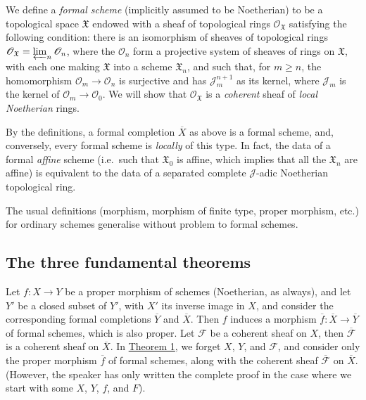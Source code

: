 \documentclass{article}
\newcommand{\oldpage}[1]{\marginpar{\footnotesize$\Big\vert$ \textit{p.~#1}}}
\theoremstyle{definition}
\theoremstyle{definition}
\theoremstyle{definition}
\theoremstyle{definition}
\theoremstyle{remark}
\begin{document}
We define a \emph{formal scheme} (implicitly assumed to be Noetherian) to be a topological space \({\mathfrak{X}}\) endowed with a sheaf of topological rings \({\mathscr{O}}_{{\mathfrak{X}}}\) satisfying the following condition:
there is an isomorphism of sheaves of topological rings \({\mathscr{O}}_{{\mathfrak{X}}}=\varprojlim_n{\mathscr{O}}_n\), where the \({\mathscr{O}}_n\) form a projective system of sheaves of rings on \({\mathfrak{X}}\), with each one making \({\mathfrak{X}}\) into a scheme \({\mathfrak{X}}_n\), and such that, for \(m\geqslant n\), the homomorphism \({\mathscr{O}}_m\to{\mathscr{O}}_n\) is surjective and has \({\mathscr{J}}_m^{n+1}\) as its kernel, where \({\mathscr{J}}_m\) is the kernel of \({\mathscr{O}}_m\to{\mathscr{O}}_0\).
We will show that \({\mathscr{O}}_{{\mathfrak{X}}}\) is a \emph{coherent} sheaf of \emph{local Noetherian} rings.

\oldpage{182-04}By the definitions, a formal completion \(\overline{X}\) as above is a formal scheme, and, conversely, every formal scheme is \emph{locally} of this type.
In fact, the data of a formal \emph{affine} scheme (i.e.~such that \({\mathfrak{X}}_0\) is affine, which implies that all the \({\mathfrak{X}}_n\) are affine) is equivalent to the data of a separated complete \({\mathscr{J}}\)-adic Noetherian topological ring.

The usual definitions (morphism, morphism of finite type, proper morphism, etc.) for ordinary schemes generalise without problem to formal schemes.

\hypertarget{fga-2-section-3}{%
\subsection{The three fundamental theorems}\label{fga-2-section-3}}

Let \(f\colon X\to Y\) be a proper morphism of schemes (Noetherian, as always), and let \(Y'\) be a closed subset of \(Y'\), with \(X'\) its inverse image in \(X\), and consider the corresponding formal completions \(\overline{Y}\) and \(\overline{X}\).
Then \(f\) induces a morphism \(\overline{f}\colon\overline{X}\to\overline{Y}\) of formal schemes, which is also proper.
Let \({\mathscr{F}}\) be a coherent sheaf on \(X\), then \(\overline{{\mathscr{F}}}\) is a coherent sheaf on \(\overline{X}\).
In \protect\hyperlink{fga-2-theorem-1}{Theorem 1}, we forget \(X\), \(Y\), and \({\mathscr{F}}\), and consider only the proper morphism \(\overline{f}\) of formal schemes, along with the coherent sheaf \(\overline{{\mathscr{F}}}\) on \(\overline{X}\).
(However, the speaker has only written the complete proof in the case where we start with some \(X\), \(Y\), \(f\), and \(F\)).
\end{document}
